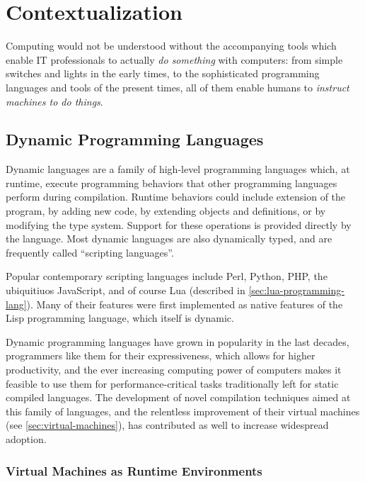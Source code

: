
\chapter{Contextualization}

Computing would not be understood without the accompanying tools which enable
IT professionals to actually \emph{do something} with computers: from simple
switches and lights in the early times, to the sophisticated programming
languages and tools of the present times, all of them enable humans to
\emph{instruct machines to do things}.


\section{Dynamic Programming Languages}

Dynamic languages are a family of high-level programming languages which,
at runtime, execute programming behaviors that other programming languages
perform during compilation. Runtime behaviors could include extension of the
program, by adding new code, by extending objects and definitions, or by
modifying the type system. Support for these operations is provided
directly by the language. Most dynamic languages are also dynamically
typed, and are frequently called “scripting languages”.

Popular contemporary scripting languages include Perl, Python, PHP, the
ubiquitiuos JavaScript, and of course Lua (described in
\autoref{sec:lua-programming-lang}). Many of their features were first
implemented as native features of the Lisp programming language, which itself
is dynamic.

Dynamic programming languages have grown in popularity in the last decades,
programmers like them for their expressiveness, which allows for higher
productivity, and the ever increasing computing power of computers makes it
feasible to use them for performance-critical tasks traditionally left for
static compiled languages. The development of novel compilation techniques
aimed at this family of languages, and the relentless improvement of their
virtual machines (see \autoref{sec:virtual-machines}), has contributed as well
to increase widespread adoption.

\subsection{Virtual Machines as Runtime Environments}
  \label{sec:virtual-machines}

